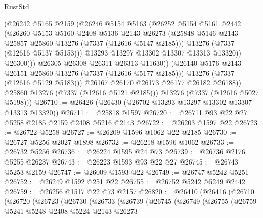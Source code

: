 \begin{lexlean}{RustStd}
\begin{coremodule}
                      (@26242
                        @5165
                        @2159
                        (@26246
                          @5154
                          @5163
                          (@26252
                            @5154
                            @5161
                            @2442
                            (@26260
                              @5153
                              @5160
                              @2408
                              @5136
                              @2143
                              @26273
                              (@25848 @5146 @2143 @25857 @25860 @13276 (@7337 (@12616 @5147 @2185)))
                              @13276
                              (@7337 (@12616 @5137 @5153)))
                            @13293
                            @13297
                            @13302
                            @13307
                            @13313
                            @13320))
                        @26300)))
                  @26305
                  @26308
                  @26311
                  @26313
                  @11630))
              (@26140 @5176 @2143 @26151 @25860 @13276 (@7337 (@12616 @5177 @2185)))
              @13276
              (@7337 (@12616 @5129 @5183)))
            @26167
            @26170
            @26173
            @26177
            @26182
            @26188))
        @25860
        @13276
        (@7337 (@12616 @5121 @2185)))
      @13276
      (@7337 (@12616 @5027 @5198)))
@26710 := @26426 (@26430 (@26702 @13293 @13297 @13302 @13307 @13313 @13320))
@26711 := @25818 @1597
@26720 := @26711 @93 @22 @27 @5258 @2185 @2159 @2408 @5216 @2143
@26722 := @26203 @1597 @22
@26723 := @26722 @5258
@26727 := @26209 @1596 @1062 @22 @2185
@26730 := @26727 @5256 @2027 @1898
@26732 := @26218 @1596 @1062
@26733 := @26732 @5256
@26736 := @26224 @1595 @24 @73
@26739 := @26736 @2176 @5255 @26237
@26743 := @26223 @1593 @93 @22 @27
@26745 := @26743 @5253 @2159
@26747 := @26009 @1593 @22
@26749 := @26747 @5242 @5251
@26752 := @26249 @1592 @251 @22
@26755 := @26752 @5242 @5249 @2442
@26759 := @26256 @1517 @22 @73 @2157
@26820 := @26410
    (@26416
      (@26710
        (@26720
          (@26723
            (@26730
              (@26733
                (@26739
                  (@26745
                    (@26749
                      (@26755
                        (@26759
                          @5241
                          @5248
                          @2408
                          @5224
                          @2143
                          @26273

\end{coremodule}
\end{lexlean}
